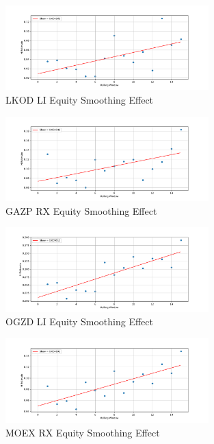     \begin{figure}[h]
        \centering
        \includegraphics[width=0.7\textwidth]{fig/LKOD LI Equity Smoothing Effect.pdf}
        \caption{LKOD LI Equity Smoothing Effect}
    \end{figure}

    \begin{figure}[h]
        \centering
        \includegraphics[width=0.7\textwidth]{fig/GAZP RX Equity Smoothing Effect.pdf}
        \caption{GAZP RX Equity Smoothing Effect}
    \end{figure} 

    \begin{figure}[h]
        \centering
        \includegraphics[width=0.7\textwidth]{fig/OGZD LI Equity Smoothing Effect.pdf}
        \caption{OGZD LI Equity Smoothing Effect}
    \end{figure} 

    \begin{figure}[h]
        \centering
        \includegraphics[width=0.7\textwidth]{fig/MOEX RX Equity Smoothing Effect.pdf}
        \caption{MOEX RX Equity Smoothing Effect}
    \end{figure} 

